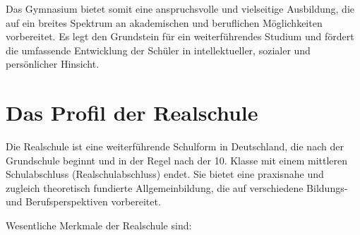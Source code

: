 Das Gymnasium bietet somit eine anspruchsvolle und vielseitige Ausbildung, die auf ein breites Spektrum an akademischen und beruflichen M\"{o}glichkeiten vorbereitet. Es legt den Grundstein f\"{u}r ein weiterf\"{u}hrendes Studium und f\"{o}rdert die umfassende Entwicklung der Sch\"{u}ler in intellektueller, sozialer und pers\"{o}nlicher Hinsicht.


\bip\bip
\section{Das Profil der Realschule}\label{Realschule} 

Die Realschule ist eine weiterf\"{u}hrende Schulform in Deutschland, die nach der Grundschule beginnt und in der Regel nach der 10. Klasse mit einem mittleren Schulabschluss (Realschulabschluss) endet. Sie bietet eine praxisnahe und zugleich theoretisch fundierte Allgemeinbildung, die auf verschiedene Bildungs- und Berufsperspektiven vorbereitet.

Wesentliche Merkmale der Realschule sind:

